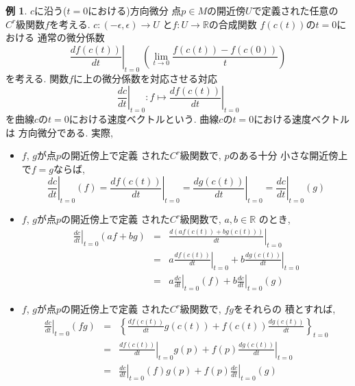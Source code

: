 \documentclass[a4j,12pt]{jarticle}
\theoremstyle{definition}
\newtheorem{example}[theorem]{例}
\begin{document}
    \begin{example}
        $c$に沿う($t=0$における)方向微分
        点$p\in M$の開近傍$U$で定義された任意の
        $C^r$級関数$f$を考える. 
        $c:(-\epsilon, \epsilon)\to U$
        と$f:U\to \mathbb{R}$の合成関数
        $f(c(t))$の$t=0$における
        通常の微分係数
        $$\left .\frac{df(c(t))}{dt}\right|_{t=0}
        \ \left( \lim_{t\to 0}
        \frac{f(c(t))-f(c(0))}{t} \right) $$
        を考える. 
        関数$f$に上の微分係数を対応させる対応
        $$\left .\frac{dc}{dt}\right|_{t=0}:
        f\mapsto 
        \left .\frac{df(c(t))}{dt}\right|_{t=0}$$
        を曲線$c$の$t=0$における速度ベクトルという. 
        曲線$c$の$t=0$における速度ベクトルは
        方向微分である. 実際, 
        \begin{itemize}
            \item[(0)]$f$, $g$が点$p$の開近傍上で定義
            された$C^r$級関数で, $p$のある十分
            小さな開近傍上で$f=g$ならば, 
            $$\left .\frac{dc}{dt}\right|_{t=0}
            (f)=\left .\frac{df(c(t))}{dt}\right|_{t=0}=
            \left .\frac{dg(c(t))}{dt}\right|_{t=0}=
            \left .\frac{dc}{dt}\right|_{t=0}(g)$$
            \item[(1)]$f$, $g$が点$p$の開近傍上で定義
            された$C^r$級関数で, $a, b\in \mathbb{R}$
            のとき, 
            \begin{eqnarray*}
                \left .\frac{dc}{dt}\right|_{t=0}
            (af+bg)&=&
            \left .\frac{d(af(c(t))+bg(c(t)))}{dt}
            \right|_{t=0}\\
            &=&
            a\left .\frac{df(c(t))}{dt}\right|_{t=0}+
            b\left .\frac{dg(c(t))}{dt}\right|_{t=0}\\
            &=&
            a\left .\frac{dc}{dt}\right|_{t=0}(f)+
            b\left .\frac{dc}{dt}\right|_{t=0}(g)
            \end{eqnarray*}
            \item[(2)]
            $f$, $g$が点$p$の開近傍上で定義
            された$C^r$級関数で, $fg$をそれらの
            積とすれば, 
            \begin{eqnarray*}
                \left .\frac{dc}{dt}\right|_{t=0}
            (fg)&=&
            \left\{\frac{df(c(t))}{dt}g(c(t))+
            f(c(t))\frac{dg(c(t))}{dt}
            \right\}_{t=0}\\
            &=&
            \left .\frac{df(c(t))}{dt}\right|_{t=0}
            g(p)+ f(p)
            \left .\frac{dg(c(t))}{dt}\right|_{t=0}\\
            &=&
            \left .\frac{dc}{dt}\right|_{t=0}(f)g(p)
            +f(p)
            \left .\frac{dc}{dt}\right|_{t=0}(g)
            \end{eqnarray*}
        \end{itemize}
    \end{example}
\end{document}
